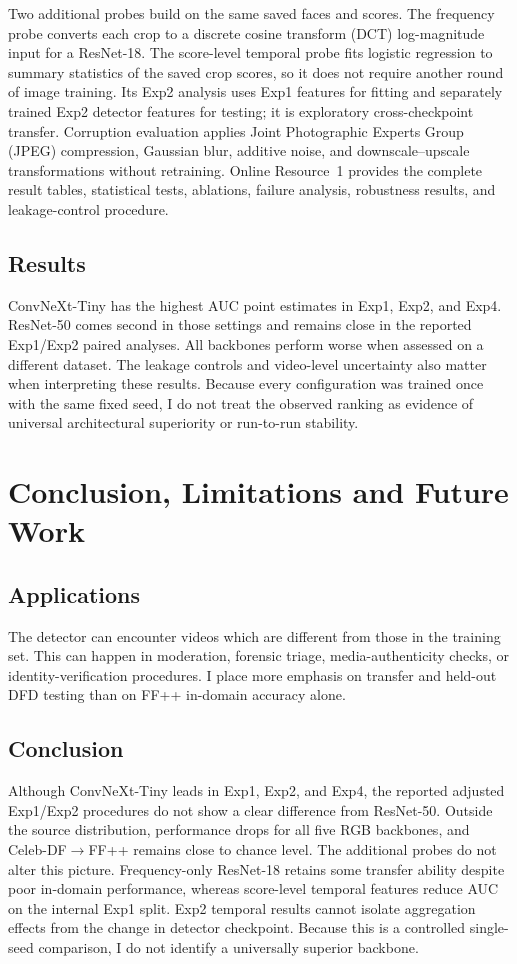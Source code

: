 \documentclass[pdflatex,sn-mathphys-num,iicol]{sn-jnl}
\begin{document}
Two additional probes build on the same saved faces and scores. The frequency probe converts each crop to a discrete cosine transform (DCT) log-magnitude input for a ResNet-18. The score-level temporal probe fits logistic regression to summary statistics of the saved crop scores, so it does not require another round of image training. Its Exp2 analysis uses Exp1 features for fitting and separately trained Exp2 detector features for testing; it is exploratory cross-checkpoint transfer. Corruption evaluation applies Joint Photographic Experts Group (JPEG) compression, Gaussian blur, additive noise, and downscale--upscale transformations without retraining. Online Resource~1 provides the complete result tables, statistical tests, ablations, failure analysis, robustness results, and leakage-control procedure.

\subsection{Results}
\label{sec:results}


ConvNeXt-Tiny has the highest AUC point estimates in Exp1, Exp2, and Exp4. ResNet-50 comes second in those settings and remains close in the reported Exp1/Exp2 paired analyses. All backbones perform worse when assessed on a different dataset. The leakage controls and video-level uncertainty also matter when interpreting these results. Because every configuration was trained once with the same fixed seed, I do not treat the observed ranking as evidence of universal architectural superiority or run-to-run stability.

\section{Conclusion, Limitations and Future Work}
\subsection{Applications}
The detector can encounter videos which are different from those in the training set. This can happen in moderation, forensic triage, media-authenticity checks, or identity-verification procedures. I place more emphasis on transfer and held-out DFD testing than on FF++ in-domain accuracy alone.


\subsection{Conclusion}
Although ConvNeXt-Tiny leads in Exp1, Exp2, and Exp4, the reported adjusted Exp1/Exp2 procedures do not show a clear difference from ResNet-50. Outside the source distribution, performance drops for all five RGB backbones, and Celeb-DF$\to$FF++ remains close to chance level. The additional probes do not alter this picture. Frequency-only ResNet-18 retains some transfer ability despite poor in-domain performance, whereas score-level temporal features reduce AUC on the internal Exp1 split. Exp2 temporal results cannot isolate aggregation effects from the change in detector checkpoint. Because this is a controlled single-seed comparison, I do not identify a universally superior backbone.
\end{document}
